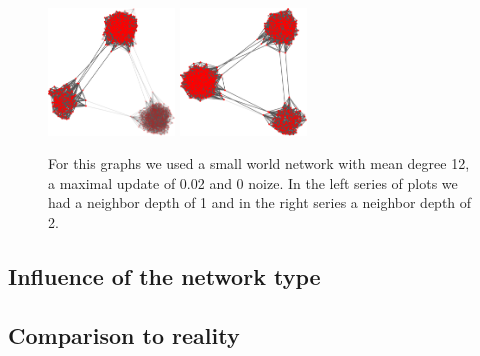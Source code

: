 \begin{figure}
\includegraphics[width=0.3\textwidth]{batchRun__kHalf=6-6-6_maxUpdate=0.02_noize=0_nbrDepth=1/network1000-crop.pdf}
\hskip2cm
\includegraphics[width=0.3\textwidth]{batchRun__kHalf=6-6-6_maxUpdate=0.02_noize=0_nbrDepth=2/network1000-crop.pdf}

\caption{For this graphs we used a small world network with mean degree 12, a maximal update of 0.02 and 0 noize. In the left series of plots we had a neighbor depth of 1 and in the right series a neighbor depth of 2.}
\label{influencenbrdepth}
\end{figure}

\subsection{Influence of the network type}
\label{sec:influencenetworktype}

\subsection{Comparison to reality}
\label{sec:comparisontoreal}